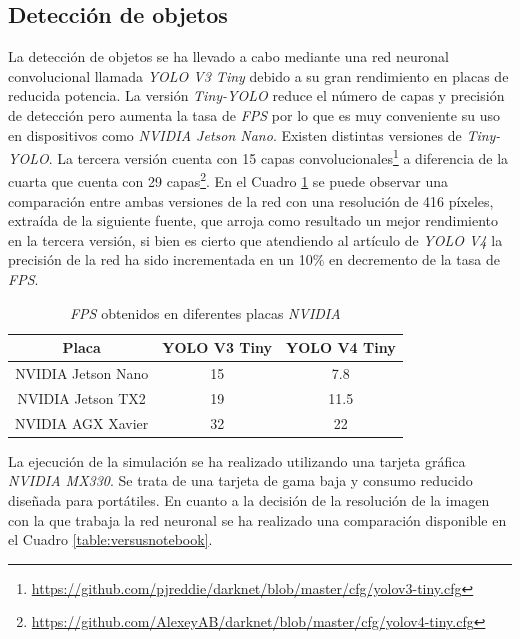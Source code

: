 \subsection{Detección de objetos}
\label{subsection:objectdetector}
La detección de objetos se ha llevado a cabo mediante una red neuronal convolucional llamada \textit{YOLO V3 Tiny} debido a su gran rendimiento en placas de reducida potencia. La versión \textit{Tiny-YOLO} reduce el número de capas y precisión de detección pero aumenta la tasa de \textit{FPS} por lo que es muy conveniente su uso en dispositivos como \textit{NVIDIA Jetson Nano}. Existen distintas versiones de \textit{Tiny-YOLO}. La tercera versión cuenta con 15 capas convolucionales\footnote{\url{https://github.com/pjreddie/darknet/blob/master/cfg/yolov3-tiny.cfg}} a diferencia de la cuarta que cuenta con 29 capas\footnote{\url{https://github.com/AlexeyAB/darknet/blob/master/cfg/yolov4-tiny.cfg}}. En el Cuadro \ref{table:v3vsv4} se puede observar una comparación entre ambas versiones de la red con una resolución de 416 píxeles, extraída de la siguiente fuente\cite{versus}, que arroja como resultado un mejor rendimiento en la tercera versión, si bien es cierto que atendiendo al artículo de \textit{YOLO V4} \cite{yolov4} la precisión de la red ha sido incrementada en un 10\% en decremento de la tasa de \textit{FPS}.\\

\begin{table}[H]
	\begin{center}
		\begin{tabular}{|c|c|c|}
			\hline
			\textbf{Placa}     & \textbf{YOLO V3 Tiny} & \textbf{YOLO V4 Tiny}
			\\
			\hline
			NVIDIA Jetson Nano & 15                    & 7.8
			\\

			NVIDIA Jetson TX2  & 19                    & 11.5
			\\
			NVIDIA AGX Xavier  & 32                    & 22
			\\
			\hline
		\end{tabular}
		\caption{\textit{FPS} obtenidos en diferentes placas \textit{NVIDIA}}
		\label{table:v3vsv4}
	\end{center}
\end{table}

La ejecución de la simulación se ha realizado utilizando una tarjeta gráfica \textit{NVIDIA MX330}. Se trata de una tarjeta de gama baja y consumo reducido diseñada para
portátiles. En cuanto a la decisión de la resolución de la imagen con la que trabaja la red neuronal se ha realizado una comparación disponible en el Cuadro
\ref{table:versusnotebook}.\\


